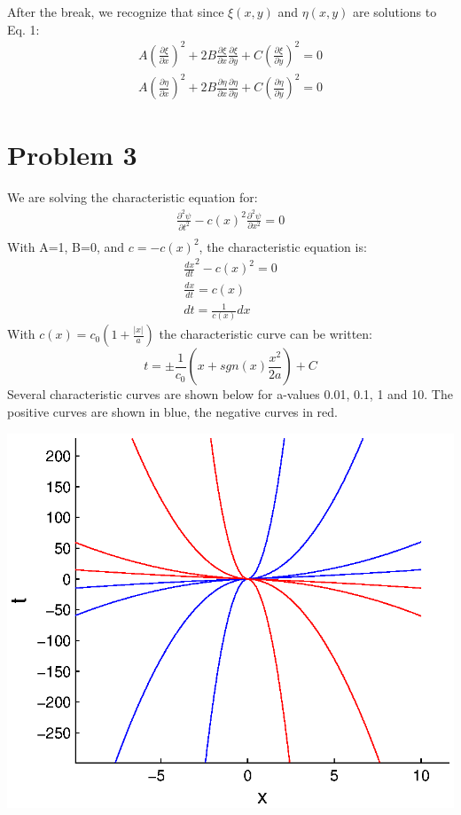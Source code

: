 \documentclass[a4paper,10pt]{article}
\numberwithin{equation}{section}
\begin{document}
After the break, we recognize that since $\xi(x,y)$ and $\eta(x,y)$ are solutions to Eq. 1:
\begin{gather}
 A(\frac{\partial \xi}{\partial x})^2+2B\frac{\partial \xi}{\partial x}\frac{\partial \xi}{ \partial y}+C(\frac{\partial \xi}{\partial y})^2=0\\
 A(\frac{\partial \eta}{\partial x})^2+2B\frac{\partial \eta}{\partial x}\frac{\partial \eta}{ \partial y}+C(\frac{\partial \eta}{\partial y})^2=0
\end{gather}

\section{Problem 3}
We are solving the characteristic equation for:
\begin{gather*}
 \frac{\partial ^2\psi}{\partial t^2}-c(x)^2\frac{\partial ^2 \psi}{\partial x^2}=0\\
\end{gather*}
With A=1, B=0, and $c=-c(x)^2$, the characteristic equation is:
\begin{gather}
\frac{dx}{dt}^2-c(x)^2=0\\
\frac{dx}{dt}=c(x)\\
dt=\frac{1}{c(x)}dx
\end{gather}
With $c(x)=c_0(1+\frac{|x|}{a})$ the characteristic curve can be written:
\begin{equation}
t=\pm\frac{1}{c_0}(x+sgn(x)\frac{x^2}{2a})+C
\end{equation}
Several characteristic curves are shown below for a-values 0.01, 0.1, 1 and 10. The positive curves are shown in blue, the negative curves in red.

\includegraphics{p3chars}
\end{document}
